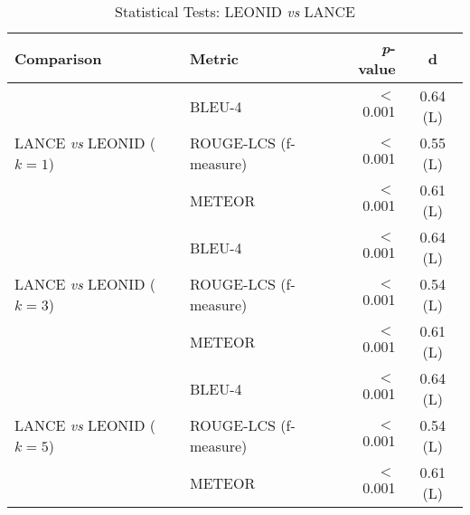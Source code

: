\begin{table}[ht]
	\centering
	\caption{Statistical Tests: LEONID \emph{vs} LANCE\vspace{-0.2cm}}
	\scriptsize
	\label{tab:test-summarizer}
	\begin{tabular}{llrc}
		\toprule
		\textbf{Comparison} & \textbf{Metric} & \textbf{\emph{p}-value} & \textbf{d} \\ 
		\midrule
		\multirow{3}{*}{LANCE  \emph{vs} LEONID ($k=1$)} & BLEU-4 & $<$0.001 & 0.64 (L) \\ 
		& ROUGE-LCS (f-measure) & $<$0.001 & 0.55 (L) \\ 
		& METEOR & $<$0.001 & 0.61 (L) \\\midrule
		\multirow{3}{*}{LANCE  \emph{vs} LEONID ($k=3$)} & BLEU-4 & $<$0.001 & 0.64 (L) \\ 
		& ROUGE-LCS (f-measure) & $<$0.001 & 0.54 (L) \\ 
		& METEOR & $<$0.001 & 0.61 (L) \\
		\bottomrule
			\multirow{3}{*}{LANCE  \emph{vs} LEONID ($k=5$)} & BLEU-4 & $<$0.001 & 0.64 (L) \\ 
		& ROUGE-LCS (f-measure) & $<$0.001 & 0.54 (L) \\ 
		& METEOR & $<$0.001 & 0.61 (L) \\
		\bottomrule
	\end{tabular}
	\vspace{-0.2cm}
\end{table}